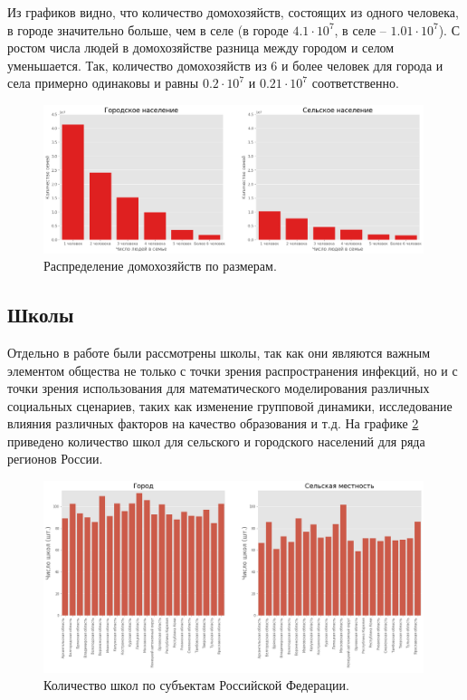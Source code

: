 \documentclass[14pt,a4paper]{article}
\begin{document}
Из графиков видно, что количество домохозяйств, состоящих из одного человека, в городе значительно больше, чем в селе (в городе $4.1 \cdot 10^7$, в селе -- $1.01 \cdot 10^7$). С ростом числа людей в домохозяйстве разница между городом и селом уменьшается. Так, количество домохозяйств из 6 и более человек для города и села примерно одинаковы и равны $0.2 \cdot 10^7$ и $0.21 \cdot 10^7$ соответственно.


\begin{figure}[h!]
	\centering
	\includegraphics[width=0.99\textwidth]{img/households_distibution_theory.png}
	\caption{Распределение домохозяйств по размерам.}
	\label{fig:households_theory1}
\end{figure}


\subsection{Школы}\label{4}

Отдельно в работе были рассмотрены школы, так как  они являются важным элементом общества не только с точки зрения распространения инфекций, но и с точки зрения использования для математического моделирования различных социальных сценариев, таких как изменение групповой динамики, исследование влияния различных факторов на качество образования и т.д. На графике \ref{fig:schools} приведено количество школ для сельского и городского населений для ряда регионов России.


\begin{figure}[h!]
	\centering
	\includegraphics[width=0.99\textwidth]{img/schools.png}
	\caption{Количество школ по субъектам Российской Федерации.}

	\label{fig:schools}
\end{figure}
\end{document}
